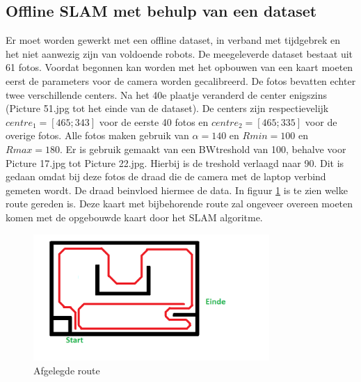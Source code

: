 \documentclass[a4paper]{article}
\begin{document}
\subsection{Offline SLAM met behulp van een dataset}
Er moet worden gewerkt met een offline dataset, in verband met tijdgebrek en het niet aanwezig zijn van voldoende robots. De meegeleverde dataset bestaat uit 61 fotos.
Voordat begonnen kan worden met het opbouwen van een kaart moeten eerst de parameters voor de camera worden gecalibreerd. De fotos bevatten echter twee verschillende centers. Na het 40e plaatje veranderd de center enigszins (Picture 51.jpg tot het einde van de dataset). De centers zijn respectievelijk $centre_1 = [465;343]$ voor de eerste 40 fotos en $centre_2=[465;335]$ voor de overige fotos. Alle fotos maken gebruik van $\alpha = 140$ en $Rmin = 100$ en $Rmax = 180$. Er is gebruik gemaakt van een BWtreshold van 100, behalve voor Picture 17.jpg tot Picture 22.jpg. Hierbij is de treshold verlaagd naar 90. Dit is gedaan omdat bij deze fotos de draad die de camera met de laptop verbind gemeten wordt. De draad beinvloed hiermee de data. In figuur \ref{fig:route} is te zien welke route gereden is.
Deze kaart met bijbehorende route zal ongeveer overeen moeten komen met de opgebouwde kaart door het SLAM algoritme.
\begin{figure}[h]
	\centering
	\includegraphics[width=0.8\textwidth]{matlab/imgs/route.png}
	\caption{Afgelegde route}
	\label{fig:route}
\end{figure}
\end{document}

